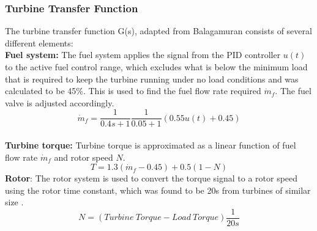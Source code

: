 \documentclass[11pt, oneside]{article}
\begin{document}
\subsubsection{Turbine Transfer Function}
The turbine transfer function G(s), adapted from Balagamuran \cite{balagamuran} consists of several different elements:
\\\textbf{Fuel system:} The fuel system applies the signal from the PID controller $u(t)$ to the active fuel control range, which excludes what is below the minimum load that is required to keep the turbine running under no load conditions and was calculated to be 45\%. This is used to find the fuel flow rate required $\dot{m}_f$. The fuel valve is adjusted accordingly.
\begin{equation}
\dot{m}_f = \frac{1}{0.4s + 1} \frac{1}{0.05 + 1} (0.55u(t) + 0.45)
\end{equation}
\\\textbf{Turbine torque:} Turbine torque is approximated as a linear function of fuel flow rate $\dot{m}_f$ and rotor speed $N$.
\begin{equation}
T = 1.3(\dot{m}_f - 0.45) + 0.5(1 - N)
\end{equation}
\textbf{Rotor}: The rotor system is used to convert the torque signal to a rotor speed using the rotor time constant, which was found to be 20s from turbines of similar size \cite{balagamuran}.
\begin{equation}
N = (Turbine \ Torque - Load \ Torque)\frac{1}{20s}
\end{equation}
\end{document}
